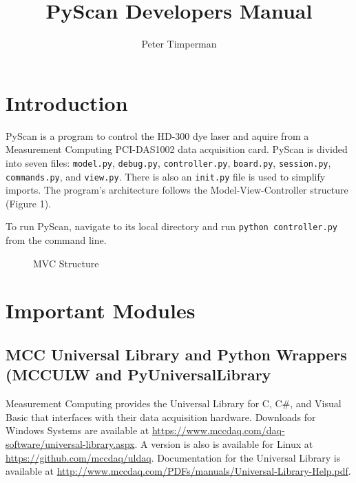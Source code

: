 \documentclass[11pt]{article}
\begin{document}
\author{Peter Timperman}
\title{PyScan Developers Manual}
\maketitle
\section{Introduction}
    PyScan is a program to control the HD-300 dye laser and aquire from a Measurement Computing PCI-DAS1002 data acquisition card. 
    PyScan is divided into seven files: \texttt{model.py}, \texttt{debug.py}, \texttt{controller.py}, \texttt{board.py}, \texttt{session.py}, \texttt{commands.py}, and \texttt{view.py}. There is also an \texttt{\textunderscore\textunderscore init.py\textunderscore\textunderscore} file is used to simplify imports. The program's architecture follows the Model-View-Controller structure (Figure 1). 
    
    To run PyScan, navigate to its local directory and run \texttt{python controller.py} from the command line.

    
    

\begin{figure}[h]
    \centering
    \caption{MVC Structure}
\end{figure} 
\section{Important Modules}
\subsection{MCC Universal Library and Python Wrappers (MCCULW and PyUniversalLibrary}
Measurement Computing provides the Universal Library for  C, C\#, and Visual Basic that interfaces with their data acquisition hardware. Downloads for Windows Systems are available at  \url{https://www.mccdaq.com/daq-software/universal-library.aspx}. A version is also is available for Linux at \url{https://github.com/mccdaq/uldaq}.  Documentation for the Universal Library is available at \url{http://www.mccdaq.com/PDFs/manuals/Universal-Library-Help.pdf}. 
\end{document}
